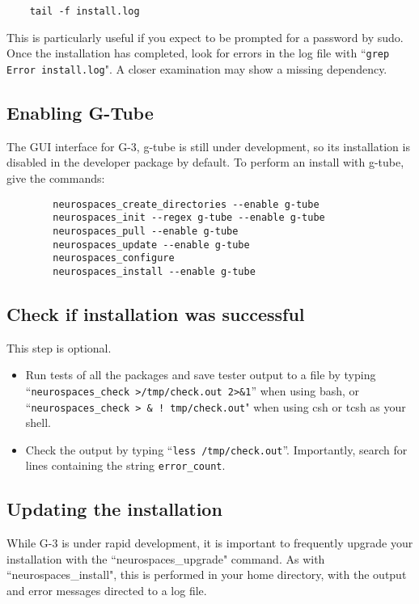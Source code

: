 \documentclass[12pt]{article}
\begin{document}
\begin{verbatim}
    tail -f install.log
\end{verbatim}

This is particularly useful if you expect to be prompted for a password
by sudo.  Once the installation has completed, look for errors in
the log file with ``{\tt grep Error install.log}".  A closer examination
may show a missing dependency.

\subsection*{Enabling G-Tube}

The GUI interface for G-3, g-tube is still under development, so its
installation is disabled in the developer package by default.
To perform an install with g-tube, give the commands:

\begin{verbatim}
        neurospaces_create_directories --enable g-tube
        neurospaces_init --regex g-tube --enable g-tube
        neurospaces_pull --enable g-tube
        neurospaces_update --enable g-tube
        neurospaces_configure
        neurospaces_install --enable g-tube
\end{verbatim}


\subsection*{Check if installation was successful}

This step is optional.
\begin{itemize}
   \item[] Run tests of all the packages and save tester output to a file  by typing
   ``{\tt neurospaces\_check >/tmp/check.out 2>\&1}'' when using bash, or
      ``{\tt neurospaces\_check >  \& !  tmp/check.out}" when using csh or tcsh as
      your shell.

   \item[] Check the output by typing ``{\tt less /tmp/check.out}''.
   Importantly, search for lines containing the string {\tt error\_count}.

\end{itemize}

\subsection*{Updating the installation}

While G-3 is under rapid development, it is important to frequently
upgrade your installation with the ``neurospaces\_upgrade" command.
As with ``neurospaces\_install", this is performed in your home directory,
with the output and error messages directed to a log file.
\end{document}
